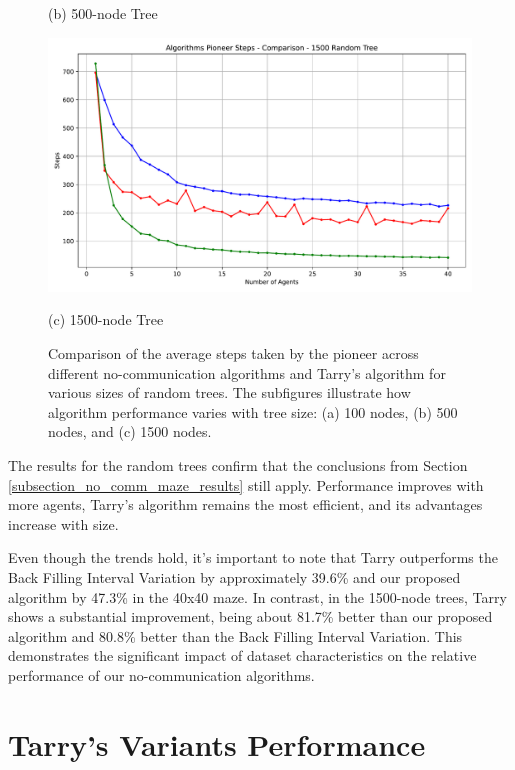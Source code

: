 \begin{figure}[H]
\begin{minipage}[b]{0.45\textwidth}
        \caption{(b) 500-node Tree}
        \label{fig_no_comm_steps_500_tree}
    \end{minipage}
    \vspace{1em}
    \begin{minipage}[b]{0.45\textwidth}
        \centering
        \includegraphics[width=\textwidth]{Cap3/no_comm_steps__1500_tree.pdf}
        \caption{(c) 1500-node Tree}
        \label{fig_no_comm_steps_1500_tree}
    \end{minipage}
    \caption{Comparison of the average steps taken by the pioneer across different no-communication algorithms and Tarry's algorithm for various sizes of random trees. The subfigures illustrate how algorithm performance varies with tree size: (a) 100 nodes, (b) 500 nodes, and (c) 1500 nodes.}
    \label{fig_no_comm_steps_all_sizes_tree}
\end{figure}

The results for the random trees confirm that the conclusions from Section \ref{subsection_no_comm_maze_results} still apply. Performance improves with more agents, Tarry's algorithm remains the most efficient, and its advantages increase with size.

Even though the trends hold, it's important to note that Tarry outperforms the Back Filling Interval Variation by approximately 39.6\% and our proposed algorithm by 47.3\% in the 40x40 maze. In contrast, in the 1500-node trees, Tarry shows a substantial improvement, being about 81.7\% better than our proposed algorithm and 80.8\% better than the Back Filling Interval Variation. This demonstrates the significant impact of dataset characteristics on the relative performance of our no-communication algorithms.


\section{Tarry's Variants Performance}
\label{section_result_tarry}


